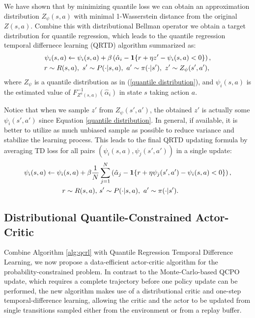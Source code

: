 We have shown that by minimizing quantile loss we can obtain an approximation distribution $Z_{\psi}(s,a)$ with minimal 1-Wasserstein distance from the original $Z(s,a)$. Combine this with distributional Bellman operator we obtain a target distribution for quantile regression, which leads to the quantile regression temporal differnece learning (QRTD) algorithm summarized as:
\begin{align}
    \psi_i(s,a)\gets \psi_i(s,a) + \beta&\left(\hat{\alpha}_i-\mathbf{1}\{r+\eta z'-\psi_i(s,a)<0\}\right), \notag \\
    r\sim R(s,a), ~s'\sim P(\cdot|s&,a), ~a'\sim\pi(\cdot|s'), ~z'\sim Z_{\psi}(s',a'), \notag  
\end{align}
where $Z_{\psi}$ is a quantile distribution as in (\ref{quantile distribution}), and $\psi_i(s,a)$ is the estimated value of $F^{-1}_{Z^{\pi}(s,a)}(\hat{\alpha}_i)$ in state $s$ taking action $a$.

Notice that when we sample $z'$ from $Z_{\psi}(s',a')$, the obtained $z'$ is actually some $\psi_{i}(s',a')$ since Equation \ref{quantile distribution}. In general, if available, it is better to utilize as much unbiased sample as possible to reduce variance and stabilize the learning process. This leads to the final QRTD updating formula by averaging TD loss for all pairs $\left(\psi_i(s,a),\psi_j(s',a')\right)$ in a single update:
\begin{align}
    \psi_i(s,a)\gets \psi_i(s,a) + \beta\frac{1}{N}&\sum_{j=1}^N\left(\hat{\alpha}_j-\mathbf{1}\{r+\eta \psi_j(s',a')-\psi_i(s,a)<0\}\right),  \\
    \notag  r\sim R(s,a), ~&s'\sim P(\cdot|s,a), ~a'\sim\pi(\cdot|s').
\end{align}

\subsection{Distributional Quantile-Constrained Actor-Critic}

Combine Algorithm \ref{alg:qcrl} with Quantile Regression Temporal Difference Learning, we now propose a data-efficient actor-critic algorithm for the probability-constrained problem. In contrast to the Monte-Carlo-based QCPO update, which requires a complete trajectory before one policy update can be performed, the new algorithm makes use of a distributional critic and one-step temporal-difference learning, allowing the critic and the actor to be updated from single transitions sampled either from the environment or from a replay buffer.

